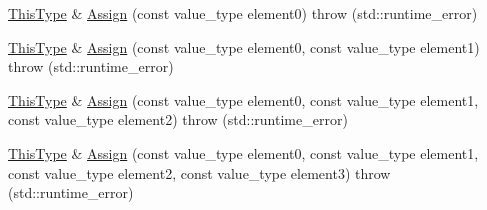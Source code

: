 {\bf }\par
\begin{DoxyCompactItemize}
\item 
\hyperlink{classvct_fixed_size_const_vector_base_a071063bc4fa43112cc287b2dbef53180}{This\-Type} \& \hyperlink{classvct_fixed_size_vector_base_a7e000228178f531cc2170f492927492a}{Assign} (const value\-\_\-type element0)  throw (std\-::runtime\-\_\-error)
\item 
\hyperlink{classvct_fixed_size_const_vector_base_a071063bc4fa43112cc287b2dbef53180}{This\-Type} \& \hyperlink{classvct_fixed_size_vector_base_aaf475cb08bd2963feb6d6c7276a696c4}{Assign} (const value\-\_\-type element0, const value\-\_\-type element1)  throw (std\-::runtime\-\_\-error)
\item 
\hyperlink{classvct_fixed_size_const_vector_base_a071063bc4fa43112cc287b2dbef53180}{This\-Type} \& \hyperlink{classvct_fixed_size_vector_base_adaa16d9bad66a6ee48558f7919d47f47}{Assign} (const value\-\_\-type element0, const value\-\_\-type element1, const value\-\_\-type element2)  throw (std\-::runtime\-\_\-error)
\item 
\hyperlink{classvct_fixed_size_const_vector_base_a071063bc4fa43112cc287b2dbef53180}{This\-Type} \& \hyperlink{classvct_fixed_size_vector_base_aa65048e7e42415f7e520629378147dbb}{Assign} (const value\-\_\-type element0, const value\-\_\-type element1, const value\-\_\-type element2, const value\-\_\-type element3)  throw (std\-::runtime\-\_\-error)
\end{DoxyCompactItemize}

